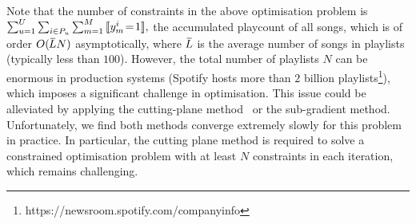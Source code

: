 Note that the number of constraints in the above optimisation problem is
$
\sum_{u=1}^U \sum_{i \in P_u} \sum_{m=1}^M \, \llbracket y_m^i \!= \!1 \rrbracket,
$
\ie the accumulated playcount of all songs,
which is of order {\small $O(\widebar{L} N)$} asymptotically, where {\small $\widebar{L}$} 
is the average number of songs in playlists (typically less than $100$). %
However,
the total number of playlists {\small $N$} can be enormous %
in production systems 
(\eg Spotify hosts more than $2$ billion playlists\footnote{https://newsroom.spotify.com/companyinfo}),
which imposes a significant challenge in optimisation. 
%
This issue could be alleviated by applying the cutting-plane method~\cite{avriel2003nonlinear} or the sub-gradient method.
Unfortunately, we find both methods converge extremely slowly for this problem in practice.
In particular, the cutting plane method is required to solve 
a constrained optimisation problem with at least {\small $N$} constraints in each iteration, 
which remains challenging. %

%

